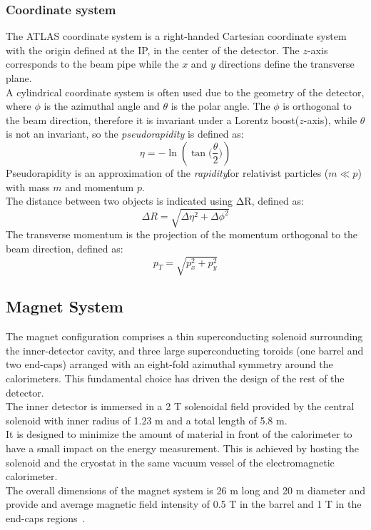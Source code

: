 \subsubsection*{Coordinate system}
The ATLAS coordinate system is a right-handed Cartesian coordinate system with the origin defined at the IP, in the center of the detector.
The $z$-axis corresponds to the beam pipe while the $x$ and $y$ directions define the transverse plane.\\
A cylindrical coordinate system is often used due to the geometry of the detector, where $\phi$ is the azimuthal angle and $\theta$ is the polar angle. 
The $\phi$ is orthogonal to the beam direction, therefore it is invariant under a Lorentz boost($z$-axis), while $\theta$ is not an invariant, so the \textit{pseudorapidity} is defined as:
\begin{equation}
\eta=-\ln{(\tan{\bigg(\frac{\theta}{2}\bigg)})}
\end{equation}
Pseudorapidity is an approximation of the \textit{rapidity}\footnotemark for relativist particles ($m\ll p$) with mass $m$ and momentum $p$.
\\The distance between two objects is indicated using $\mathrm{\Delta R}$, defined as:
\begin{equation}
\Delta R =\sqrt{\Delta \eta^{2}+\Delta \phi^{2}}
\end{equation}
The transverse momentum is the projection of the momentum orthogonal to the beam direction, defined as:
\begin{equation}
p_{T}=\sqrt{p^{2}_{x}+p^{2}_{y}}
\end{equation}

\subsection{Magnet System}
\label{sec:MagSys}
The magnet configuration comprises a thin superconducting solenoid surrounding the inner-detector cavity, and three large superconducting toroids (one barrel and two end-caps) arranged with an eight-fold azimuthal symmetry around the calorimeters. This fundamental choice has driven the design of the rest of the detector.\\
The inner detector is immersed in a 2 T solenoidal field provided by the central solenoid with inner radius of 1.23 m and a total length of 5.8 m.\\
It is designed to minimize the amount of material in front of the calorimeter to have a small impact on the energy measurement. This is achieved by hosting the solenoid and
the cryostat in the same vacuum vessel of the electromagnetic calorimeter.\\
The overall dimensions of the magnet system is 26 m long and 20 m diameter and provide and average magnetic field intensity of 0.5 T in the barrel and 1 T in the end-caps regions~\cite{MagSys}.
